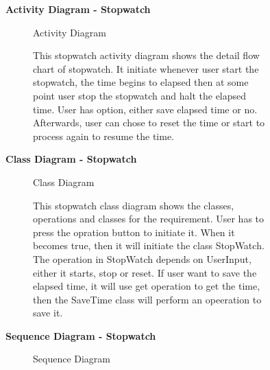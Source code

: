 \documentclass{article}
\begin{document}
	\clearpage
	

		\begin{figure}[htbp]
			\textbf{Activity Diagram - Stopwatch }
			\centering
			\begin{subfigure}{\textwidth}
				\resizebox{\textwidth}{!}{}
				\caption{Activity Diagram}
			\end{subfigure}
			\begin{subfigure}{\textwidth}
				This stopwatch activity diagram shows the detail flow chart of stopwatch. It initiate whenever user start the stopwatch, the time begins to elapsed
				then at some point user stop the stopwatch and halt the elapsed time. User has option, either save elapsed time or no. Afterwards, user can 
				chose to reset the time or start to process again to resume the time.
			\end{subfigure}
		\end{figure}
		\clearpage
		

		\begin{figure}[htbp]
			\textbf{Class Diagram - Stopwatch }
			\centering
			\begin{subfigure}{\textwidth}
				\resizebox{\textwidth}{!}{}
				\caption{Class Diagram}
			\end{subfigure}
			\begin{subfigure}{\textwidth}
				This stopwatch class diagram shows the classes, operations and classes for the requirement. User has to press 
				the opration button to initiate it. When it becomes true, then it will initiate the class StopWatch. The operation in StopWatch depends on 
				UserInput, either it starts, stop or reset. If user want to save the elapsed time, it will use get operation to get the time,
				then the SaveTime class will perform an opeeration to save it. 
			\end{subfigure}
		\end{figure}

		
		\clearpage

		\begin{figure}[htbp]
			\textbf{Sequence Diagram - Stopwatch }
			\centering
			\begin{subfigure}{\textwidth}
				\resizebox{\textwidth}{!}{}
				\caption{Sequence Diagram}
			\end{subfigure}
			\begin{subfigure}{\textwidth}

			\end{subfigure}
		\end{figure}
		\clearpage
\end{document}
